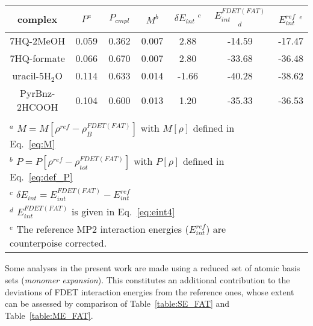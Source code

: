 \documentclass[journal=jctcce,manuscript=article]{achemso}
\newcommand{\nr}[1]{\color{red}#1\color{black}}
\begin{document}
\begin{table*}
{
\begin{center}
\begin{tabular}{|c|c|c|c|c|c|c|}
\hline
 complex & $P^a$ & $P_{cmpl}$ & $M^b$ & $\delta E_{int}\;^c$&$E^{FDET(FAT)}_{int}$ $^d$&$E_{int}^{ref}$ $^e$ \\ \hline
7HQ-2MeOH & 0.059 & 0.362 & 0.007 & 2.88 & -14.59 & -17.47 \\ \hline
7HQ-formate & 0.066 & 0.670 & 0.007 &  2.80 & -33.68 & -36.48 \\ \hline
uracil-5H$_2$O & 0.114 & 0.633 &  0.014 & -1.66 & -40.28 & -38.62 \\ \hline
PyrBnz-2HCOOH  & 0.104 & 0.600 & 0.013 & 1.20 & -35.33 &  -36.53 \\ \hline
\multicolumn{6}{c}{ } \\
\multicolumn{6}{l}{$^a$ $M=M[\rho^{ref} - \rho^{FDET(FAT)}_{B}]$ with $M[\rho]$ defined in Eq.~\ref{eq:M}}\\
\multicolumn{6}{l}{$^b$ $P=P[\rho^{ref} - \rho_{tot}^{FDET(FAT)}]$ with $P[\rho]$ defined in Eq.~\ref{eq:def_P}}\\
\multicolumn{6}{l}{$^c$ $\delta E_{int}=E^{FDET(FAT)}_{int}-E_{int}^{ref}$} \\
\multicolumn{6}{l}{$^d$ $E^{FDET(FAT)}_{int}$ is given in Eq.~\ref{eq:eint4}}\\
\multicolumn{6}{l}{$^e$ The reference MP2 interaction energies ($E_{int}^{ref}$) are \nr{counterpoise } corrected.}
\end{tabular}
\end{center}
}%
\caption{Deviations of the FDET-MP2 results from the reference data.  In FDET, \textit{freeze-and-thaw} optimised $\rho_B$ and the reduced set of atomic basis sets ({\it supermolecular expansion}) are used. 
Density measures $M$ and $P$ are given in atomic units, energies in kcal/mol.
}
\label{table:SE_FAT}
\end{table*}

Some analyses in the present work are made using a reduced set of atomic basis sets ({\it monomer expansion}). This \nr{constitutes an additional contribution } to the deviations of FDET interaction energies from the reference ones\nr{, whose extent can be assessed by comparison of Table~\ref{table:SE_FAT} and Table~\ref{table:ME_FAT}}.
\end{document}
